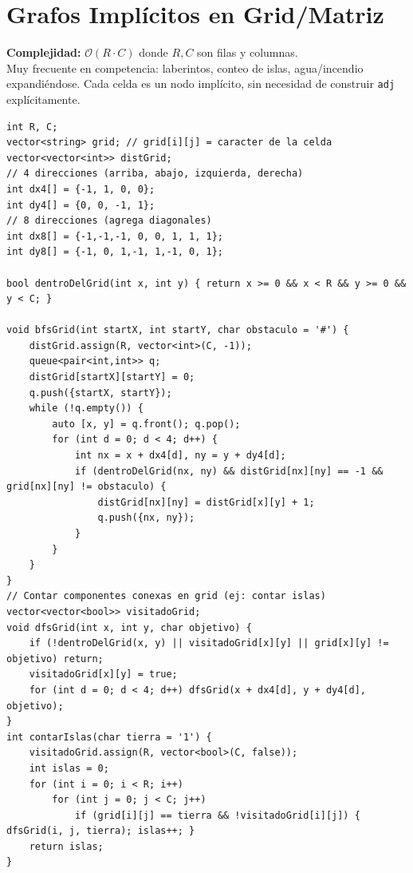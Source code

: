 \documentclass[10pt,twocolumn,letterpaper]{report}
\begin{document}
\section{Grafos Implícitos en Grid/Matriz}
\textbf{Complejidad:} $\mathcal{O}(R \cdot C)$ donde $R, C$ son filas y columnas. \\
Muy frecuente en competencia: laberintos, conteo de islas, agua/incendio expandiéndose. Cada celda es un nodo implícito, sin necesidad de construir \texttt{adj} explícitamente.
\begin{lstlisting}
int R, C;
vector<string> grid; // grid[i][j] = caracter de la celda
vector<vector<int>> distGrid;
// 4 direcciones (arriba, abajo, izquierda, derecha)
int dx4[] = {-1, 1, 0, 0};
int dy4[] = {0, 0, -1, 1};
// 8 direcciones (agrega diagonales)
int dx8[] = {-1,-1,-1, 0, 0, 1, 1, 1};
int dy8[] = {-1, 0, 1,-1, 1,-1, 0, 1};

bool dentroDelGrid(int x, int y) { return x >= 0 && x < R && y >= 0 && y < C; }

void bfsGrid(int startX, int startY, char obstaculo = '#') {
    distGrid.assign(R, vector<int>(C, -1));
    queue<pair<int,int>> q;
    distGrid[startX][startY] = 0;
    q.push({startX, startY});
    while (!q.empty()) {
        auto [x, y] = q.front(); q.pop();
        for (int d = 0; d < 4; d++) {
            int nx = x + dx4[d], ny = y + dy4[d];
            if (dentroDelGrid(nx, ny) && distGrid[nx][ny] == -1 && grid[nx][ny] != obstaculo) {
                distGrid[nx][ny] = distGrid[x][y] + 1;
                q.push({nx, ny});
            }
        }
    }
}
// Contar componentes conexas en grid (ej: contar islas)
vector<vector<bool>> visitadoGrid;
void dfsGrid(int x, int y, char objetivo) {
    if (!dentroDelGrid(x, y) || visitadoGrid[x][y] || grid[x][y] != objetivo) return;
    visitadoGrid[x][y] = true;
    for (int d = 0; d < 4; d++) dfsGrid(x + dx4[d], y + dy4[d], objetivo);
}
int contarIslas(char tierra = '1') {
    visitadoGrid.assign(R, vector<bool>(C, false));
    int islas = 0;
    for (int i = 0; i < R; i++)
        for (int j = 0; j < C; j++)
            if (grid[i][j] == tierra && !visitadoGrid[i][j]) { dfsGrid(i, j, tierra); islas++; }
    return islas;
}
\end{lstlisting}

\end{document}
